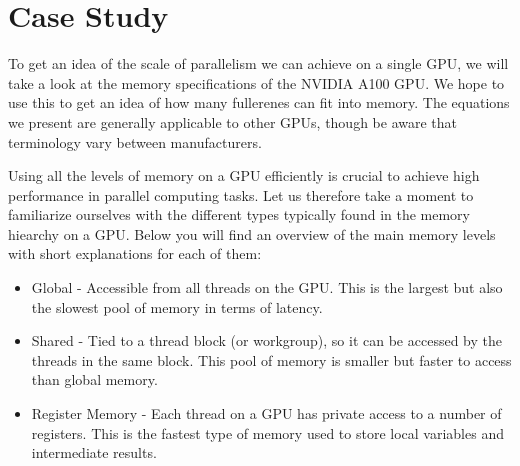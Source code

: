 \section{Case Study}

To get an idea of the scale of parallelism we can achieve on a single GPU, we will take a look at the memory specifications of the NVIDIA A100 GPU. We hope to use this to get an idea of how many fullerenes can fit into memory. The equations we present are generally applicable to other GPUs, though be aware that terminology vary between manufacturers.

Using all the levels of memory on a GPU efficiently is crucial to achieve high performance in parallel computing tasks. Let us therefore take a moment to familiarize ourselves with the different types typically found in the memory hiearchy on a GPU. Below you will find an overview of the main memory levels with short explanations for each of them:

\begin{itemize}
  \item Global - Accessible from all threads on the GPU. This is the largest but also the slowest pool of memory in terms of latency.
  \item Shared - Tied to a thread block (or workgroup), so it can be accessed by the threads in the same block. This pool of memory is smaller but faster to access than global memory.
  \item Register Memory - Each thread on a GPU has private access to a number of registers. This is the fastest type of memory used to store local variables and intermediate results.
\end{itemize}


